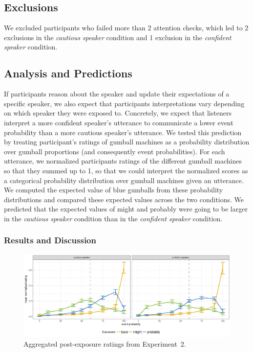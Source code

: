 \documentclass[lucida,biblatex]{sp} %
\begin{document}
\subsection{Exclusions}

We excluded participants who failed more than 2 attention checks, which led to 2 exclusions in the \emph{cautious speaker} condition and 1 exclusion in the \emph{confident speaker} condition.


\subsection{Analysis and Predictions}

If participants reason about the speaker and update their expectations of a specific speaker, we also expect that participants interpretations 
vary depending on which speaker they were exposed to. Concretely, we expect that listeners interpret a more confident speaker's utterance 
to communicate a lower event probability than a more cautious speaker's utterance. We tested this prediction by treating participant's ratings 
of gumball machines as a probability distribution over gumball proportions (and consequently event probabilities).  For each utterance, we 
normalized participants ratings of the different gumball machines so that they summed up to 1, so that we could interpret the normalized scores 
as a categorical probability distribution over gumball machines given an utterance. We computed the expected value of blue gumballs from these probability distributions and compared these expected values across the two conditions. We predicted that the expected values of {\sc might} and {\sc probably} were going to be larger in the \emph{cautious speaker} condition than in the \emph{confident speaker} condition.

\subsubsection{Results and Discussion}

\begin{figure}
\includegraphics[width=\textwidth]{plots/exp-2-ratings.pdf}
\caption{Aggregated post-exposure ratings from Experiment~2.  \label{fig:adaptation-results-comp}}
\end{figure}
\end{document}
